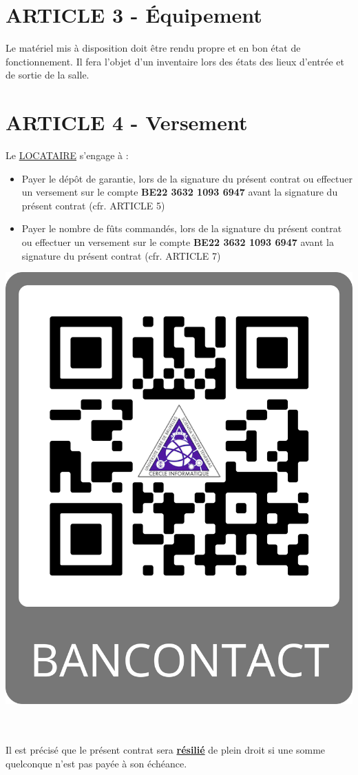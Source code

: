 \documentclass{article}
\begin{document}
\section*{ARTICLE 3 - Équipement}
Le matériel mis à disposition doit être rendu propre et en bon état de fonctionnement. Il fera l’objet d’un inventaire lors des états des lieux d’entrée et de sortie de la salle.

\section*{ARTICLE 4 - Versement}
Le \underline{LOCATAIRE} s’engage à :

\begin{minipage}{0.6\textwidth}
\begin{itemize}
    \item Payer le dépôt de garantie, lors de la signature du présent contrat ou effectuer un versement sur le compte \textbf{BE22 3632 1093 6947} avant la signature du présent contrat (cfr. ARTICLE 5)
    \item Payer le nombre de fûts commandés, lors de la signature du présent contrat ou effectuer un versement sur le compte \textbf{BE22 3632 1093 6947} avant la signature du présent contrat (cfr. ARTICLE 7)
\end{itemize}
\end{minipage}
\begin{minipage}{0.4\textwidth}\raggedleft
\includegraphics[scale=0.04]{QRCodeBancontact.png}
\end{minipage}\\\\
Il est précisé que le présent contrat sera \textbf{\underline{résilié}} de plein droit si une somme quelconque n’est pas payée à son échéance.
\end{document}
